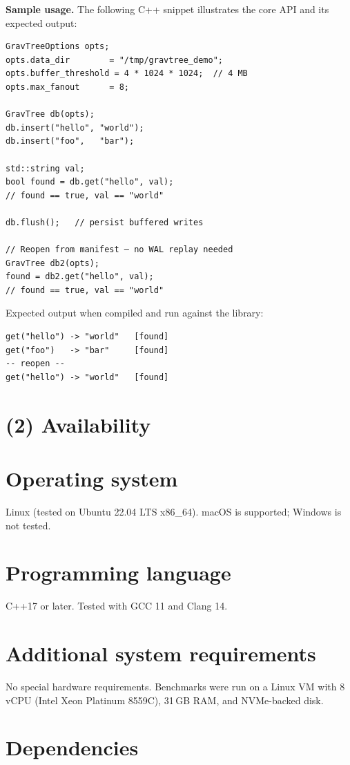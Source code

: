 \documentclass{jors}
\begin{document}
\textbf{Sample usage.} The following C++ snippet illustrates the core
API and its expected output:

\begin{verbatim}
GravTreeOptions opts;
opts.data_dir        = "/tmp/gravtree_demo";
opts.buffer_threshold = 4 * 1024 * 1024;  // 4 MB
opts.max_fanout      = 8;

GravTree db(opts);
db.insert("hello", "world");
db.insert("foo",   "bar");

std::string val;
bool found = db.get("hello", val);
// found == true, val == "world"

db.flush();   // persist buffered writes

// Reopen from manifest — no WAL replay needed
GravTree db2(opts);
found = db2.get("hello", val);
// found == true, val == "world"
\end{verbatim}

Expected output when compiled and run against the library:
\begin{verbatim}
get("hello") -> "world"   [found]
get("foo")   -> "bar"     [found]
-- reopen --
get("hello") -> "world"   [found]
\end{verbatim}

\section*{(2) Availability}

\section*{Operating system}

Linux (tested on Ubuntu 22.04 LTS x86\_64). macOS is supported; Windows
is not tested.

\section*{Programming language}

C++17 or later. Tested with GCC 11 and Clang 14.

\section*{Additional system requirements}

No special hardware requirements. Benchmarks were run on a Linux VM with
8 vCPU (Intel Xeon Platinum 8559C), 31\,GB RAM, and NVMe-backed disk.

\section*{Dependencies}
\end{document}
